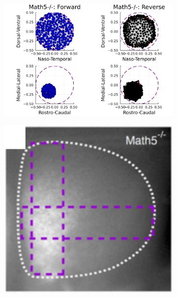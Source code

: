\begin{figure}
\begin{subfigure}{\textwidth}
	\end{subfigure}
	~
	\begin{subfigure}{0.6\textwidth}
		\centering
		\includegraphics[width=\textwidth]{images/distributed_kernels/figure_lattice_math5}	
		\caption{\label{fig:math5_lattice}}
	\end{subfigure}
		\begin{subfigure}{0.4\textwidth}
		\centering
		\includegraphics[width=\textwidth]{images/distributed_kernels/math5}	
		\caption{}
	\end{subfigure}

\end{figure}
